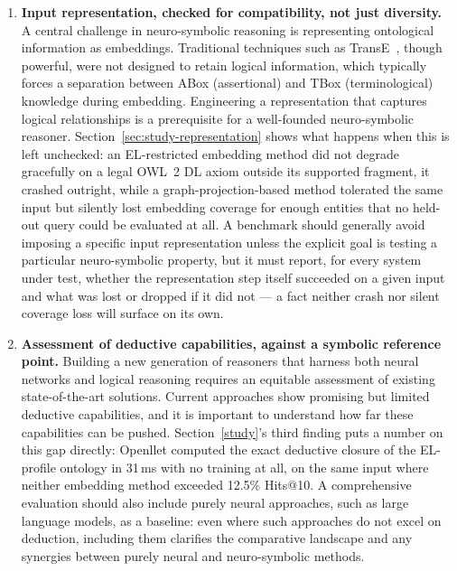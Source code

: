 \begin{enumerate}
    \item \textbf{Input representation, checked for compatibility, not just diversity.} A central challenge in neuro-symbolic reasoning is representing ontological information as embeddings. Traditional techniques such as TransE~\cite{Bordes_EL+}, though powerful, were not designed to retain logical information, which typically forces a separation between ABox (assertional) and TBox (terminological) knowledge during embedding. Engineering a representation that captures logical relationships is a prerequisite for a well-founded neuro-symbolic reasoner. Section~\ref{sec:study-representation} shows what happens when this is left unchecked: an EL-restricted embedding method did not degrade gracefully on a legal OWL~2 DL axiom outside its supported fragment, it crashed outright, while a graph-projection-based method tolerated the same input but silently lost embedding coverage for enough entities that no held-out query could be evaluated at all. A benchmark should generally avoid imposing a specific input representation unless the explicit goal is testing a particular neuro-symbolic property, but it must report, for every system under test, whether the representation step itself succeeded on a given input and what was lost or dropped if it did not — a fact neither crash nor silent coverage loss will surface on its own.

    \item \textbf{Assessment of deductive capabilities, against a symbolic reference point.} Building a new generation of reasoners that harness both neural networks and logical reasoning requires an equitable assessment of existing state-of-the-art solutions. Current approaches show promising but limited deductive capabilities, and it is important to understand how far these capabilities can be pushed. Section~\ref{study}'s third finding puts a number on this gap directly: Openllet computed the exact deductive closure of the EL-profile ontology in 31\,ms with no training at all, on the same input where neither embedding method exceeded 12.5\% Hits@10. A comprehensive evaluation should also include purely neural approaches, such as large language models, as a baseline: even where such approaches do not excel on deduction, including them clarifies the comparative landscape and any synergies between purely neural and neuro-symbolic methods.


\end{enumerate}
